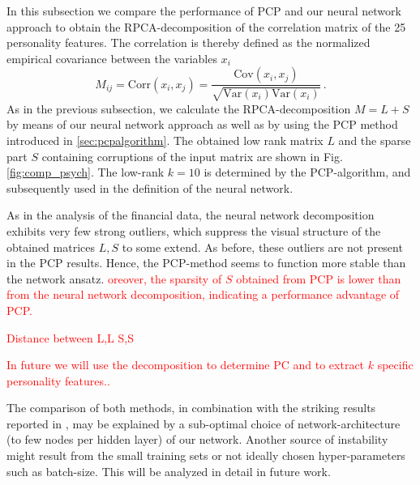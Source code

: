 In this subsection we compare the performance of PCP and our neural network approach to obtain the RPCA-decomposition of the correlation matrix of the 25 personality features. The correlation is thereby defined as the normalized empirical covariance between the variables $x_i$
\[
M_{ij} = \text{Corr}(x_i,x_j) = \frac{\text{Cov}(x_i,x_j)}{\sqrt{\text{Var}(x_i) \text{Var}(x_i)}} \,.
\]
As in the previous subsection, we calculate the RPCA-decomposition $M=L + S$ by means of our neural network approach as well as by using the PCP method introduced in \ref{sec:pcpalgorithm}. The obtained low rank matrix $L$ and the sparse part $S$ containing corruptions of the input matrix are shown in Fig. \ref{fig:comp_psych}. The low-rank $k=10$ is determined by the PCP-algorithm, and subsequently used in the definition of the neural network.

As in the analysis of the financial data, the neural network decomposition exhibits very few strong outliers, which suppress the visual structure of the obtained matrices $L,S$ to some extend. As before, these outliers are not present in the PCP results. Hence, the PCP-method seems to function more stable than the network ansatz. \textcolor{red}{oreover, the sparsity of $S$ obtained from PCP is lower than from the neural network decomposition, indicating a performance advantage of PCP.}

\textcolor{red}{Distance between L,L S,S}

\textcolor{red}{In future we will use the decomposition to determine PC and to extract $k$ specific personality features..}

The comparison of both methods, in combination with the striking results reported in \cite{herrera2020denise}, may be explained by a sub-optimal choice of network-architecture (to few nodes per hidden layer) of our network. Another source of instability might result from the small training sets or not ideally chosen hyper-parameters such as batch-size. This will be analyzed in detail in future work.





